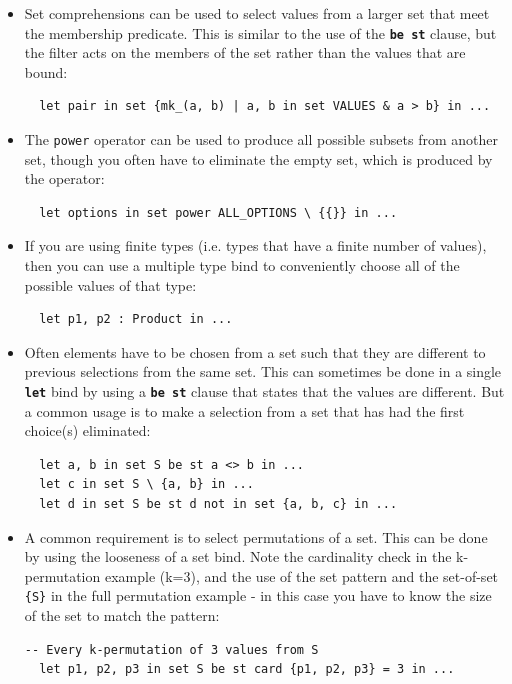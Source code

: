 \documentclass{overturerepchap}
\begin{document}
\begin{itemize}
  \item Set comprehensions can be used to select values from a larger set that
  meet the membership predicate. This is similar to the use of the \texttt{\textbf{be
  st}} clause, but the filter acts on the members of the set rather than the
  values that are bound:
\small
\begin{lstlisting}
  let pair in set {mk_(a, b) | a, b in set VALUES & a > b} in ...
\end{lstlisting}
\normalsize
  \item The \texttt{power} operator can be used to produce all possible subsets
  from another set, though you often have to eliminate the empty set, which is
  produced by the operator:
\small
\begin{lstlisting}
  let options in set power ALL_OPTIONS \ {{}} in ...
\end{lstlisting}
\normalsize
  \item If you are using finite types (i.e. types that have a finite number of
  values), then you can use a multiple type bind to conveniently choose all of
  the possible values of that type:
\small
\begin{lstlisting}
  let p1, p2 : Product in ...
\end{lstlisting}
\normalsize
  \item Often elements have to be chosen from a set such that they are different
  to previous selections from the same set. This can sometimes be done in a
  single \texttt{\textbf{let}} bind by using a \texttt{\textbf{be st}} clause that states that the
  values are different. But a common usage is to make a selection from a set
  that has had the first choice(s) eliminated:
\small
\begin{lstlisting}
  let a, b in set S be st a <> b in ...
  let c in set S \ {a, b} in ...
  let d in set S be st d not in set {a, b, c} in ...
\end{lstlisting}
\normalsize
  \item A common requirement is to select permutations of a set. This can be
  done by using the looseness of a set bind. Note the cardinality check in the
  k-permutation example (k=3), and the use of the set pattern and the
  set-of-set \texttt{\{S\}} in the full permutation example - in this case you
  have to know the size of the set to match the pattern:
\small
\begin{lstlisting}
-- Every k-permutation of 3 values from S
  let p1, p2, p3 in set S be st card {p1, p2, p3} = 3 in ...

\end{lstlisting}
\end{itemize}
\end{document}
